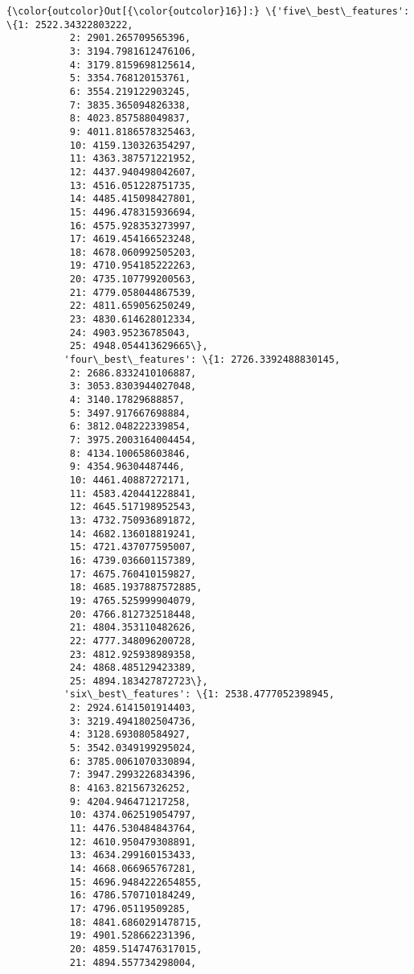 \documentclass[11pt]{article}
\begin{document}
\begin{Verbatim}[commandchars=\\\{\}]
{\color{outcolor}Out[{\color{outcolor}16}]:} \{'five\_best\_features': \{1: 2522.34322803222,
           2: 2901.265709565396,
           3: 3194.7981612476106,
           4: 3179.8159698125614,
           5: 3354.768120153761,
           6: 3554.219122903245,
           7: 3835.365094826338,
           8: 4023.857588049837,
           9: 4011.8186578325463,
           10: 4159.130326354297,
           11: 4363.387571221952,
           12: 4437.940498042607,
           13: 4516.051228751735,
           14: 4485.415098427801,
           15: 4496.478315936694,
           16: 4575.928353273997,
           17: 4619.454166523248,
           18: 4678.060992505203,
           19: 4710.954185222263,
           20: 4735.107799200563,
           21: 4779.058044867539,
           22: 4811.659056250249,
           23: 4830.614628012334,
           24: 4903.95236785043,
           25: 4948.054413629665\},
          'four\_best\_features': \{1: 2726.3392488830145,
           2: 2686.8332410106887,
           3: 3053.8303944027048,
           4: 3140.17829688857,
           5: 3497.917667698884,
           6: 3812.048222339854,
           7: 3975.2003164004454,
           8: 4134.100658603846,
           9: 4354.96304487446,
           10: 4461.40887272171,
           11: 4583.420441228841,
           12: 4645.517198952543,
           13: 4732.750936891872,
           14: 4682.136018819241,
           15: 4721.437077595007,
           16: 4739.036601157389,
           17: 4675.760410159827,
           18: 4685.1937887572885,
           19: 4765.525999904079,
           20: 4766.812732518448,
           21: 4804.353110482626,
           22: 4777.348096200728,
           23: 4812.925938989358,
           24: 4868.485129423389,
           25: 4894.183427872723\},
          'six\_best\_features': \{1: 2538.4777052398945,
           2: 2924.6141501914403,
           3: 3219.4941802504736,
           4: 3128.693080584927,
           5: 3542.0349199295024,
           6: 3785.0061070330894,
           7: 3947.2993226834396,
           8: 4163.821567326252,
           9: 4204.946471217258,
           10: 4374.062519054797,
           11: 4476.530484843764,
           12: 4610.950479308891,
           13: 4634.299160153433,
           14: 4668.066965767281,
           15: 4696.9484222654855,
           16: 4786.570710184249,
           17: 4796.05119509285,
           18: 4841.6860291478715,
           19: 4901.528662231396,
           20: 4859.5147476317015,
           21: 4894.557734298004,

\end{Verbatim}
\end{document}
